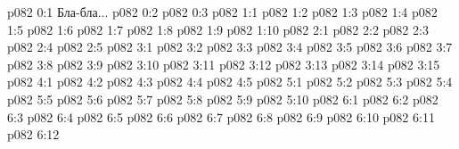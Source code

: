 \author{Глава Серафимов}
\vs p082 0:1  Бла-бла...
\vs p082 0:2 
\vs p082 0:3 
\vs p082 1:1 
\vs p082 1:2 
\vs p082 1:3 \pc 
\vs p082 1:4 
\vs p082 1:5 
\vs p082 1:6 \pc 
\vs p082 1:7 
\vs p082 1:8 
\vs p082 1:9 
\vs p082 1:10 
\vs p082 2:1 
\vs p082 2:2 \pc 
\vs p082 2:3 
\vs p082 2:4 
\vs p082 2:5 \pc 
{}
\vs p082 3:1 
\vs p082 3:2 
\vs p082 3:3 
\vs p082 3:4 \pc 
\vs p082 3:5 
\vs p082 3:6 
\vs p082 3:7 
\vs p082 3:8 \pc 
\vs p082 3:9 
\vs p082 3:10 
\vs p082 3:11 
\vs p082 3:12 \pc 
\vs p082 3:13 
\vs p082 3:14 
\vs p082 3:15 
\vs p082 4:1 
\vs p082 4:2 
\vs p082 4:3 
\vs p082 4:4 
\vs p082 4:5 
\vs p082 5:1 
\vs p082 5:2 
\vs p082 5:3 \pc 
\vs p082 5:4 \pc 
\vs p082 5:5 
\vs p082 5:6 \pc 
\vs p082 5:7 
\vs p082 5:8 
\vs p082 5:9 
\vs p082 5:10 
\vs p082 6:1 
\vs p082 6:2 
\vs p082 6:3 
\vs p082 6:4 
\vs p082 6:5 
\vs p082 6:6 
\vs p082 6:7 
\vs p082 6:8 \pc 
\vs p082 6:9 
\vs p082 6:10 \pc 
\vs p082 6:11 
\vsetoff
\vs p082 6:12 
\quizlink
